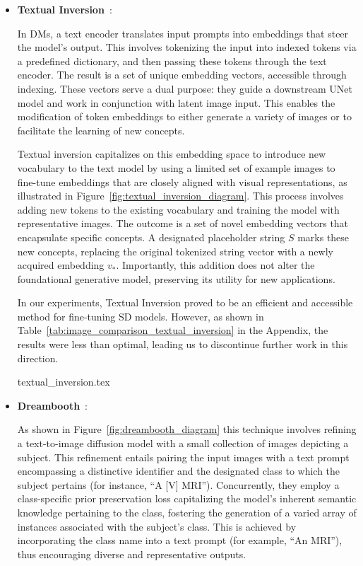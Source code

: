 \begin{itemize}
    \item \textbf{Textual Inversion}~\cite{textual_inversion}: 
    
In DMs, a text encoder translates input prompts into embeddings that steer the model's output. This involves tokenizing the input into indexed tokens via a predefined dictionary, and then passing these tokens through the text encoder. The result is a set of unique embedding vectors, accessible through indexing. These vectors serve a dual purpose: they guide a downstream UNet model and work in conjunction with latent image input. This enables the modification of token embeddings to either generate a variety of images or to facilitate the learning of new concepts.

Textual inversion capitalizes on this embedding space to introduce new vocabulary to the text model by using a limited set of example images to fine-tune embeddings that are closely aligned with visual representations, as illustrated in Figure~\ref{fig:textual_inversion_diagram}. This process involves adding new tokens to the existing vocabulary and training the model with representative images. The outcome is a set of novel embedding vectors that encapsulate specific concepts. A designated placeholder string $S$ marks these new concepts, replacing the original tokenized string vector with a newly acquired embedding $v_{*}$. Importantly, this addition does not alter the foundational generative model, preserving its utility for new applications.

In our experiments, Textual Inversion proved to be an efficient and accessible method for fine-tuning SD models. However, as shown in Table~\ref{tab:image_comparison_textual_inversion} in the Appendix, the results were less than optimal, leading us to discontinue further work in this direction.

{textual_inversion.tex}

    \item \textbf{Dreambooth}~\cite{ruiz2023dreambooth}: 

As shown in Figure~\ref{fig:dreambooth_diagram} this technique involves refining a text-to-image diffusion model with a small collection of images depicting a subject. This refinement entails pairing the input images with a text prompt encompassing a distinctive identifier and the designated class to which the subject pertains (for instance, ``A [V] MRI''). Concurrently, they employ a class-specific prior preservation loss capitalizing the model's inherent semantic knowledge pertaining to the class, fostering the generation of a varied array of instances associated with the subject's class. This is achieved by incorporating the class name into a text prompt (for example, ``An MRI''), thus encouraging diverse and representative outputs.
    

\end{itemize}
